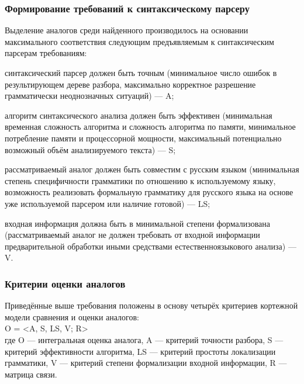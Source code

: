 \subsubsection{Формирование требований к синтаксическому парсеру}
Выделение аналогов среди найденного производилось на основании максимального соответствия следующим предъявляемым к синтаксическим парсерам требованиям:
\begin{list}{}{\leftmargin=1.5cm}
	\item синтаксический парсер должен быть точным (минимальное число ошибок в результирующем дереве разбора, максимально корректное разрешение грамматически неоднозначных ситуаций) --- A;
	\item алгоритм синтаксического анализа должен быть эффективен (минимальная временная сложность алгоритма и сложность алгоритма по памяти, минимальное потребление памяти и процессорной мощности, максимальный потенциально возможный объём анализируемого текста) --- S;
	\item рассматриваемый аналог должен быть совместим с русским языком (минимальная степень специфичности грамматики по отношению к используемому языку, возможность реализовать формальную грамматику для русского языка на основе уже используемой парсером или наличие готовой) --- LS;
	\item входная информация должна быть в минимальной степени формализована (рассматриваемый аналог не должен требовать от входной информации предварительной обработки иными средствами естественноязыкового анализа) --- V.
\end{list}

\subsubsection{Критерии оценки аналогов}
Приведённые выше требования положены в основу четырёх критериев кортежной модели сравнения и оценки аналогов:\\
O = <A, S, LS, V; R>\\
где O --- интегральная оценка аналога, A --- критерий точности разбора, S --- критерий эффективности алгоритма, LS --- критерий простоты локализации грамматики, V --- критерий степени формализации входной информации, R --- матрица связи.

